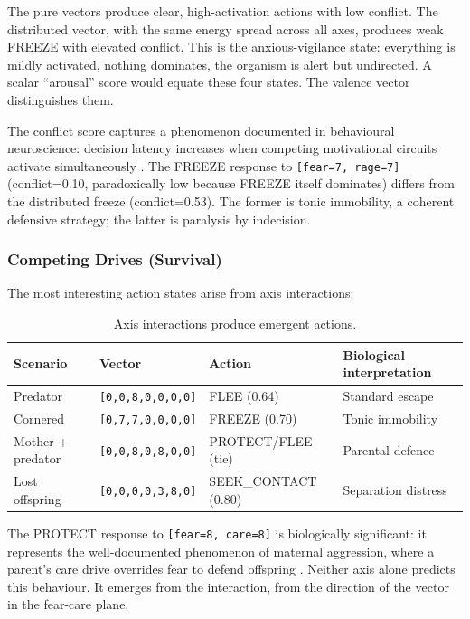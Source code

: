 \documentclass[11pt]{article}
\begin{document}
The pure vectors produce clear, high-activation actions with low conflict. The distributed vector, with the same energy spread across all axes, produces weak FREEZE with elevated conflict. This is the anxious-vigilance state: everything is mildly activated, nothing dominates, the organism is alert but undirected. A scalar ``arousal'' score would equate these four states. The valence vector distinguishes them.

The conflict score captures a phenomenon documented in behavioural neuroscience: decision latency increases when competing motivational circuits activate simultaneously \citep{mcnaughton2004}. The FREEZE response to \texttt{[fear=7, rage=7]} (conflict=0.10, paradoxically low because FREEZE itself dominates) differs from the distributed freeze (conflict=0.53). The former is tonic immobility, a coherent defensive strategy; the latter is paralysis by indecision.

\subsubsection{Competing Drives (Survival)}

The most interesting action states arise from axis interactions:

\begin{table}[h]
\centering
\caption{Axis interactions produce emergent actions.}
\label{tab:competing}
\begin{tabular}{llll}
\toprule
\textbf{Scenario} & \textbf{Vector} & \textbf{Action} & \textbf{Biological interpretation} \\
\midrule
Predator & \texttt{[0,0,8,0,0,0,0]} & FLEE (0.64) & Standard escape \\
Cornered & \texttt{[0,7,7,0,0,0,0]} & FREEZE (0.70) & Tonic immobility \\
Mother + predator & \texttt{[0,0,8,0,8,0,0]} & PROTECT/FLEE (tie) & Parental defence \\
Lost offspring & \texttt{[0,0,0,0,3,8,0]} & SEEK\_CONTACT (0.80) & Separation distress \\
\bottomrule
\end{tabular}
\end{table}

The PROTECT response to \texttt{[fear=8, care=8]} is biologically significant: it represents the well-documented phenomenon of maternal aggression, where a parent's care drive overrides fear to defend offspring \citep{lonstein2002}. Neither axis alone predicts this behaviour. It emerges from the interaction, from the direction of the vector in the fear-care plane.
\end{document}
